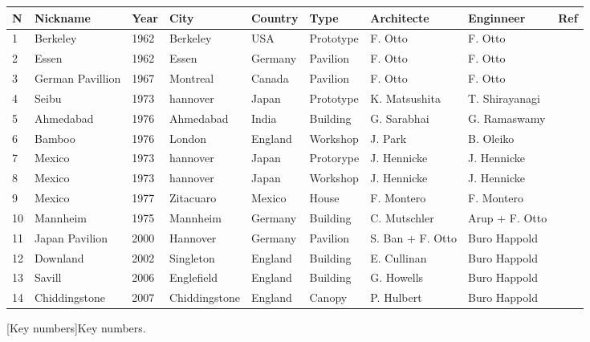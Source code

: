 \begin{landscape}%
\begin{table}[p]
\centering\small
{}
 	\begin{tabularx}{20cm}{@{}l X l l l l l l r@{}}
	\toprule
 	N	& Nickname		& Year	& City			& Country		& Type		& Architecte 			& Enginneer			& Ref \\ 
	\midrule
	1 	& Berkeley		& 1962	& Berkeley		& USA		& Prototype	& F. Otto	 			& F. Otto				& \cite{IL10} \\
	2 	& Essen			& 1962	& Essen			& Germany	& Pavilion		& F. Otto	 			& F. Otto				& \cite{IL10} \\
	3 	& German Pavillion	& 1967	& Montreal		& Canada		& Pavilion		& F. Otto	 			& F. Otto				& \cite{IL10} \\
	4 	& Seibu			& 1973	& hannover			& Japan		& Prototype	& K. Matsushita	 		& T. Shirayanagi		& \cite[p.~245]{IL13} \\
	5 	& Ahmedabad		& 1976	& Ahmedabad		& India		& Building		& G. Sarabhai 			& G. Ramaswamy		& \cite[p.~249]{IL13} \\
	6 	& Bamboo			& 1976	& London			& England		& Workshop	& J. Park 				& B. Oleiko			& \cite{IL13} \\

	7 	& Mexico			& 1973	& hannover			& Japan		& Protorype	& J. Hennicke			& J. Hennicke			& \cite{IL13} \\
	8 	& Mexico			& 1973	& hannover			& Japan		& Workshop	& J. Hennicke			& J. Hennicke			& \cite{IL13} \\

	9 	& Mexico			& 1977	& Zitacuaro		& Mexico		& House		& F. Montero			& F. Montero			& \cite{IL13} \\

	\midrule
	10 	& Mannheim		& 1975	& Mannheim		& Germany	& Building		& C. Mutschler 	 		& Arup + F. Otto  		& \cite{IL13} \\
	11 	& Japan Pavilion	& 2000	& Hannover		& Germany	& Pavilion		& S. Ban + F. Otto		& Buro Happold 		& \cite{} \\
	12 	& Downland		& 2002	& Singleton		& England		& Building		& E. Cullinan	 		& Buro Happold		& \cite{Harris2003} \\
	13 	& Savill			& 2006	& Englefield		& England		& Building		& G. Howells			& Buro Happold		& \cite{Harris2008} \\
	14 	& Chiddingstone	& 2007	& Chiddingstone	& England		& Canopy		& P. Hulbert			& Buro Happold		& \cite{} \\
	
	\bottomrule
 	\end{tabularx}
[Key numbers]{Key numbers.}
\end{table}
\end{landscape}%




